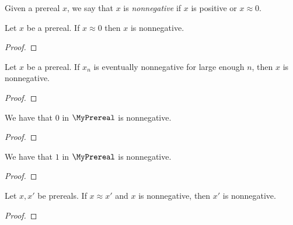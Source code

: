 \begin{definition}
    \leanok
    Given a prereal $x$, we say that $x$ is \emph{nonnegative} if $x$ is positive or $x \approx 0$.
\end{definition}

\begin{lemma}
    \leanok
    Let $x$ be a prereal.
    If $x \approx 0$ then $x$ is nonnegative.
\end{lemma}
\begin{proof}
    \leanok
\end{proof}

\begin{lemma}
    \leanok
    Let $x$ be a prereal.
    If $x_n$ is eventually nonnegative for large enough $n$, then $x$ is nonnegative.
\end{lemma}
\begin{proof}
    \leanok
\end{proof}

\begin{lemma}
    \leanok
    We have that $0$ in $\MyPrereal$ is nonnegative.
\end{lemma}
\begin{proof}
    \leanok
\end{proof}

\begin{lemma}
    \leanok
    We have that $1$ in $\MyPrereal$ is nonnegative.
\end{lemma}
\begin{proof}
    \leanok
\end{proof}

\begin{lemma}
    \leanok
    Let $x,x'$ be prereals.
    If $x \approx x'$ and $x$ is nonnegative, then $x'$ is nonnegative.
\end{lemma}
\begin{proof}
\end{proof}

